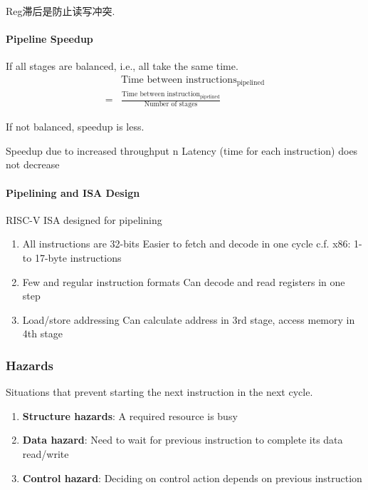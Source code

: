 Reg滞后是防止读写冲突. 

\paragraph{Pipeline Speedup}
If all stages are balanced, i.e., all take the same time. 
\begin{align*}
    &\text{Time between instructions}_{\text{pipelined}}\\
    =&\frac{\text{Time between instruction}_{\text{pipelined}}}{\text{Number of stages}}
\end{align*}

If not balanced, speedup is less. 

Speedup due to increased throughput
n Latency (time for each instruction) does not
decrease

\paragraph{Pipelining and ISA Design}
RISC-V ISA designed for pipelining

\begin{enumerate}\small
    \item All instructions are 32-bits
    \subitem Easier to fetch and decode in one cycle
    \subitem c.f. x86: 1- to 17-byte instructions
    \item Few and regular instruction formats
    \subitem Can decode and read registers in one step
    \item Load/store addressing
    \subitem Can calculate address in 3rd stage, access memory in 4th stage
\end{enumerate}

\subsubsection{Hazards}

Situations that prevent starting the next instruction in the next cycle. 

\begin{enumerate}
    \item \textbf{Structure hazards}: A required resource is busy
    \item \textbf{Data hazard}: Need to wait for previous instruction to complete its data read/write
    \item \textbf{Control hazard}: Deciding on control action depends on previous instruction
\end{enumerate}

